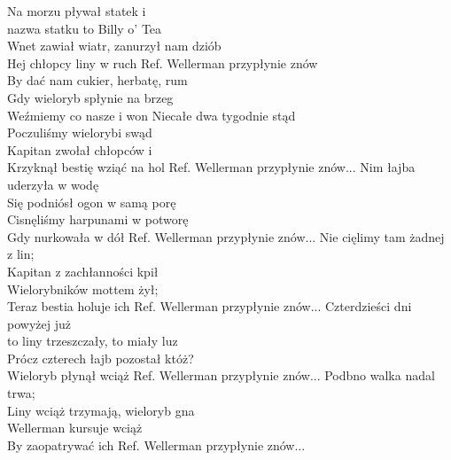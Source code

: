 Na morzu pływał statek i\\
nazwa statku to Billy o' Tea \\
Wnet zawiał wiatr, zanurzył nam dziób\\
Hej chłopcy liny w ruch 
\hops
Ref. Wellerman przypłynie znów\\
 By dać nam cukier, herbatę, rum\\
 Gdy wieloryb spłynie na brzeg\\
 Weźmiemy co nasze i won
\hops
Niecałe dwa tygodnie stąd\\
Poczuliśmy wielorybi swąd\\
Kapitan zwołał chłopców i\\
Krzyknął bestię wziąć na hol 
\hops
Ref. Wellerman przypłynie znów...
\hops
Nim łajba uderzyła w wodę \\
Się podniósł ogon w samą porę\\
Cisnęliśmy harpunami w potworę\\
Gdy nurkowała w dół 
\hops
Ref. Wellerman przypłynie znów...
\hops
Nie cięlimy tam żadnej z lin;\\
Kapitan z zachłanności kpił \\
Wielorybników mottem żył; \\
Teraz bestia holuje ich
\hops
Ref. Wellerman przypłynie znów...
\hops
Czterdzieści dni powyżej już\\
to liny trzeszczały, to miały luz\\
Prócz czterech łajb pozostał któż?\\
Wieloryb płynął wciąż
\hops
Ref. Wellerman przypłynie znów...
\hops
Podbno walka nadal trwa; \\
Liny wciąż trzymają, wieloryb gna\\
Wellerman kursuje wciąż\\
By zaopatrywać ich
\hops
Ref. Wellerman przypłynie znów...